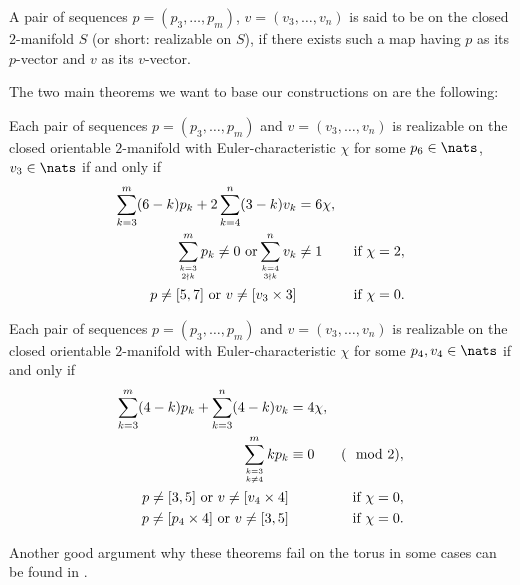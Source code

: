 \begin{definition}\label{def:realizable}
  A pair of sequences $p = (p_3, \dots, p_m)$, $v = (v_3, \dots, v_n)$ is said to be  on the closed $2$-manifold $S$ (or short: realizable on $S$), if there exists such a map having $p$ as its $p$-vector and $v$ as its $v$-vector.
\end{definition}

The two main theorems we want to base our constructions on are the following:

\begin{theorem} \label{thm:eberhard:extended:3}
  Each pair of sequences $p = (p_3, \dots, p_m)$ and $v = (v_3, \dots, v_n)$ is realizable on the closed orientable $2$-manifold with {\sc Euler}-characteristic $\chi$ for some $p_6 \in \nats$, $v_3 \in \nats$ if and only if
  \begin{align*}
    \sum_{k=3}^m (6-k)p_k + 2 \sum_{k=4}^n (3-k)v_k &= 6\chi, \\
    \sum_{k=3 \atop 2 \nmid k}^{m} p_k \neq 0 \text{ or} \sum_{k=4 \atop 3 \nmid k}^n v_k &\neq 1 &\text{ if } \chi = 2, \\
    p \neq [5, 7] \text{ or } v \neq [v_3 \times 3]  &&\text{ if } \chi = 0.
  \end{align*}
\end{theorem}

\begin{theorem} \label{thm:eberhard:extended:4}
  Each pair of sequences $p = (p_3, \dots, p_m)$ and $v = (v_3, \dots, v_n)$ is realizable on the closed orientable $2$-manifold with {\sc Euler}-characteristic $\chi$ for some $p_4, v_4 \in \nats$ if and only if
  \begin{align*}
    \sum_{k=3}^m (4-k)p_k + \sum_{k = 3}^n (4-k)v_k &= 4\chi, \\
    \sum_{k=3 \atop k \neq 4}^m k p_k &\equiv 0& (\mod 2), \\
    p \neq [3, 5] \text{ or } v \neq [v_4 \times 4] &&\text{ if } \chi = 0,\\
    p \neq [p_4 \times 4] \text{ or } v \neq [3, 5] &&\text{ if } \chi = 0.
  \end{align*}
\end{theorem}

Another good argument why these theorems fail on the torus in some cases can be found in \cite{izmestiev2013there}.